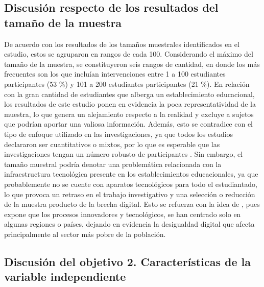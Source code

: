 \documentclass[spanish]{textolivre}
\begin{document}
\subsection{Discusión respecto de los resultados del tamaño de la muestra}\label{sec-outras-estr}
De acuerdo con los resultados de los tamaños muestrales identificados en el estudio, estos se agruparon en rangos de cada 100. Considerando el máximo del tamaño de la muestra, se constituyeron seis rangos de cantidad, en donde los más frecuentes son los que incluían intervenciones entre 1 a 100 estudiantes participantes (53 \%) y 101 a 200 estudiantes participantes (21 \%). En relación con la gran cantidad de estudiantes que alberga un establecimiento educacional, los resultados de este estudio ponen en evidencia la poca representatividad de la muestra, lo que genera un alejamiento respecto a la realidad y excluye a sujetos que podrían aportar una valiosa información. Además, esto se contradice con el tipo de enfoque utilizado en las investigaciones, ya que todos los estudios declararon ser cuantitativos o mixtos, por lo que es esperable que las investigaciones tengan un número robusto de participantes \cite{delice_sampling_2010}. Sin embargo, el tamaño muestral podría denotar una problemática relacionada con la infraestructura tecnológica presente en los establecimientos educacionales, ya que probablemente no se cuente con aparatos tecnológicos para todo el estudiantado, lo que provoca un retraso en el trabajo investigativo y una selección o reducción de la muestra producto de la brecha digital. Esto se refuerza con la idea de \textcite{gomez_navarro_brecha_2018}, pues expone que los procesos innovadores y tecnológicos, se han centrado solo en algunas regiones o países, dejando en evidencia la desigualdad digital que afecta principalmente al sector más pobre de la población.

\subsection{Discusión del objetivo 2. Características de la variable independiente}\label{sec-listas}
\end{document}
